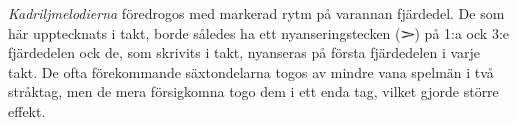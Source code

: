 \thispagestyle{empty}
\vspace*{5cm}
\begin{adjustwidth*}{30mm}{30mm}
\setlength{\parindent}{0em}

\textit{Kadriljmelodierna} föredrogos med markerad rytm på
varannan fjärdedel. De som här upptecknats i  takt, borde
således ha ett nyanseringstecken (\includegraphics[width=1em]{include/accent.pdf}) på 1:a ock 3:e fjärdedelen
ock de, som skrivits i  takt, nyanseras på första
fjärdedelen i varje takt. De ofta förekommande säxtondelarna
togos av mindre vana spelmän i två \guillemotright{}stråktag\guillemotright{}, men de mera
försigkomna togo dem i ett enda \guillemotright{}tag\guillemotright{}, vilket gjorde större
\guillemotright{}effekt\guillemotright{}.

\end{adjustwidth*}

